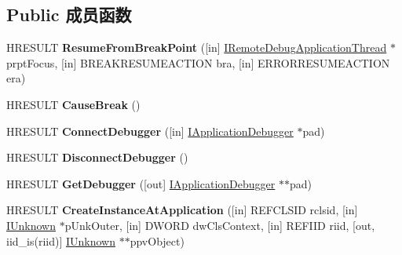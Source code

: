 \subsection*{Public 成员函数}
\begin{DoxyCompactItemize}
\item 
\mbox{\label{interface_i_remote_debug_application_afb63540fd851ac1169a11a61410a9444}} 
H\+R\+E\+S\+U\+LT {\bfseries Resume\+From\+Break\+Point} (\mbox{[}in\mbox{]} \hyperlink{interface_i_remote_debug_application_thread}{I\+Remote\+Debug\+Application\+Thread} $\ast$prpt\+Focus, \mbox{[}in\mbox{]} B\+R\+E\+A\+K\+R\+E\+S\+U\+M\+E\+A\+C\+T\+I\+ON bra, \mbox{[}in\mbox{]} E\+R\+R\+O\+R\+R\+E\+S\+U\+M\+E\+A\+C\+T\+I\+ON era)
\item 
\mbox{\label{interface_i_remote_debug_application_a9ee2165c85154659433345ee072fea00}} 
H\+R\+E\+S\+U\+LT {\bfseries Cause\+Break} ()
\item 
\mbox{\label{interface_i_remote_debug_application_a7377af0a961ce70a0e8aae8bcdb8d4f7}} 
H\+R\+E\+S\+U\+LT {\bfseries Connect\+Debugger} (\mbox{[}in\mbox{]} \hyperlink{interface_i_application_debugger}{I\+Application\+Debugger} $\ast$pad)
\item 
\mbox{\label{interface_i_remote_debug_application_a3d4b3c7fe571a5e2c3dada9baa8e4c48}} 
H\+R\+E\+S\+U\+LT {\bfseries Disconnect\+Debugger} ()
\item 
\mbox{\label{interface_i_remote_debug_application_a8171fcef3f506a24948b4fd3c4515013}} 
H\+R\+E\+S\+U\+LT {\bfseries Get\+Debugger} (\mbox{[}out\mbox{]} \hyperlink{interface_i_application_debugger}{I\+Application\+Debugger} $\ast$$\ast$pad)
\item 
\mbox{\label{interface_i_remote_debug_application_a7685373f6d84746c42c8f86c28ab5251}} 
H\+R\+E\+S\+U\+LT {\bfseries Create\+Instance\+At\+Application} (\mbox{[}in\mbox{]} R\+E\+F\+C\+L\+S\+ID rclsid, \mbox{[}in\mbox{]} \hyperlink{interface_i_unknown}{I\+Unknown} $\ast$p\+Unk\+Outer, \mbox{[}in\mbox{]} D\+W\+O\+RD dw\+Cls\+Context, \mbox{[}in\mbox{]} R\+E\+F\+I\+ID riid, \mbox{[}out, iid\+\_\+is(riid)\mbox{]} \hyperlink{interface_i_unknown}{I\+Unknown} $\ast$$\ast$ppv\+Object)

\end{DoxyCompactItemize}
